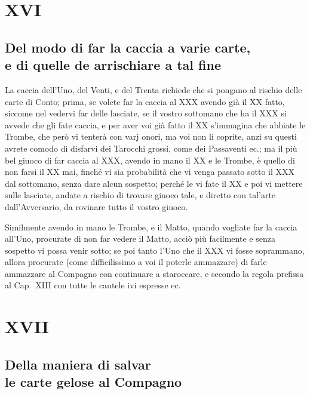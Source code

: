 \documentclass[11pt,a6paper]{article}
\begin{document}
\section{XVI}
\subsection*{Del modo di far la caccia a varie carte,\\
e di quelle de arrischiare a tal fine}

La caccia dell'Uno, del Venti, e del
Trenta richiede che si pongano al rischio delle carte di Conto; prima, se volete far la caccia al XXX avendo già il XX fatto, siccome nel vedervi far delle lasciate, se il vostro sottomano che ha il XXX si avvede che gli fate caccia, e per aver voi già fatto il XX s'immagina che abbiate le Trombe, che però vi tenterà con varj onori, ma voi non li coprite, anzi su questi avrete comodo di disfarvi dei Tarocchi grossi, come dei Passaventi ec.;
ma il più bel giuoco di far caccia al XXX, avendo in mano il XX e le Trombe, è quello di non farsi il XX mai, finché vi sia probabilità che vi venga passato sotto il XXX dal sottomano, senza dare alcun sospetto; perché le vi fate il XX e poi vi mettere sulle lasciate, andate a rischio di trovare giuoco tale,
e diretto con tal'arte dall'Avversario, da rovinare tutto il vostro giuoco.

Similmente avendo in mano le Trombe, e il Matto, quando vogliate far la caccia all'Uno, procurate di non far vedere il Matto, acciò più facilmente e senza sospetto vi possa venir sotto; se poi tanto l'Uno che il XXX vi fosse soprammano, allora procurate (come difficilissimo a voi il poterle ammazzare) di farle ammazzare al Compagno con continuare a staroccare, e secondo la regola prefissa al Cap.\ XIII con tutte le cautele ivi espresse ec.

\section{XVII}
\subsection*{Della maniera di salvar\\ le carte gelose al Compagno}
\end{document}
